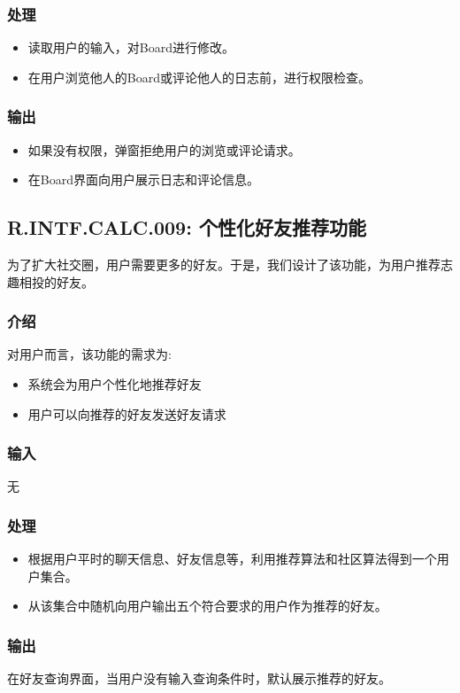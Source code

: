 \subsubsection{处理}
\begin{itemize}
  \item 读取用户的输入，对Board进行修改。
  \item 在用户浏览他人的Board或评论他人的日志前，进行权限检查。
\end{itemize}
\subsubsection{输出}
\begin{itemize}
  \item 如果没有权限，弹窗拒绝用户的浏览或评论请求。
  \item 在Board界面向用户展示日志和评论信息。
\end{itemize}

\subsection{R.INTF.CALC.009: 个性化好友推荐功能}
为了扩大社交圈，用户需要更多的好友。于是，我们设计了该功能，为用户推荐志趣相投的好友。
\subsubsection{介绍}
对用户而言，该功能的需求为:
\begin{itemize}
  \item 系统会为用户个性化地推荐好友
  \item 用户可以向推荐的好友发送好友请求
\end{itemize}
\subsubsection{输入}
无
\subsubsection{处理}
\begin{itemize}
  \item 根据用户平时的聊天信息、好友信息等，利用推荐算法和社区算法得到一个用户集合。
  \item 从该集合中随机向用户输出五个符合要求的用户作为推荐的好友。
\end{itemize}
\subsubsection{输出}
在好友查询界面，当用户没有输入查询条件时，默认展示推荐的好友。

